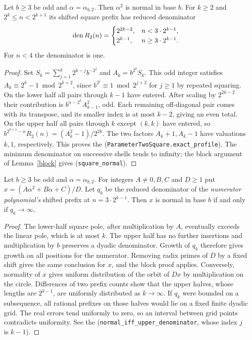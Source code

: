 \documentclass[11pt]{article}
\begin{document}
\begin{theorem}\label{square}
Let \(b\ge3\) be odd and \(\alpha=\alpha_{b,2}\). Then \(\alpha^2\) is
normal in base \(b\).
For \(k\ge2\) and \(2^k\le n<2^{k+1}\) its shifted square prefix has
reduced denominator
\[
 \operatorname{den} R_2(n)=
 \begin{cases}2^{2k-2},& n<3\cdot2^{k-1},\\
               2^{k-1},& n\ge3\cdot2^{k-1}.
 \end{cases}
\]
For \(n<4\) the denominator is one. 
\end{theorem}
\begin{proof}
Set \(S_k=\sum_{j=1}^k2^{k-j}b^{-2^j}\) and \(A_k=b^{2^k}S_k\).
This odd integer satisfies \(A_k\equiv2^k-1\bmod 2^{k+2}\),
since \(b^{2^j}\equiv1\bmod2^{j+2}\) for \(j\ge1\) by repeated squaring.
On the lower half all pairs through \(k-1\) have entered. After scaling
by \(2^{2k-2}\) their contribution is \(b^{n-2^k}A_{k-1}^2\), odd.
Each remaining off-diagonal pair comes with its transpose, and its smaller
index is at most \(k-2\), giving an even total. On the upper half all
pairs through \(k\) except \((k,k)\) have entered, so
\(b^{2^{k+1}-n}R_2(n)=(A_k^2-1)/2^{2k}\).
The two factors \(A_k+1,A_k-1\) have valuations \(k,1\), respectively.
This proves the 
(\texttt{ParameterTwoSquare.exact\_profile}).
The minimum denominator on successive shells tends to infinity; the block
argument of Lemma~\ref{block} gives
 (\texttt{square\_normal}).
\end{proof}

\begin{theorem}\label{quad}
Let \(b\ge3\) be odd and \(\alpha=\alpha_{b,2}\).
For integers \(A\ne0,B,C\) and \(D\ge1\) put
\(x=(A\alpha^2+B\alpha+C)/D\). Let \(q_k\) be the reduced denominator
of the \emph{numerator polynomial's} shifted prefix at \(n=3\cdot2^{k-1}\).
Then \(x\) is normal in base \(b\) if and only if \(q_k\to\infty\).
\end{theorem}
\begin{proof}
The lower-half square pole, after multiplication by \(A\), eventually
exceeds the linear pole, which is at most \(k\). The upper half has no
further insertions and multiplication by \(b\) preserves a dyadic
denominator. Growth of \(q_k\) therefore gives growth on all positions
for the numerator. Removing radix primes of \(D\) by a fixed shift gives
the same conclusion for \(x\), and the block proof applies. Conversely,
normality of \(x\) gives uniform distribution of the orbit of \(Dx\) by
multiplication on the circle. Differences of two prefix counts show that
the upper halves, whose lengths are \(2^{k-1}\), are uniformly distributed
as \(k\to\infty\). If \(q_k\) were bounded on a subsequence, all rational
prefixes on those halves would lie on a fixed finite dyadic grid.
The real errors tend uniformly to zero, so an interval between grid points
contradicts uniformity. See the 
(\texttt{normal\_iff\_upper\_denominator}, whose index \(j\) is \(k-1\)).
\end{proof}
\end{document}

